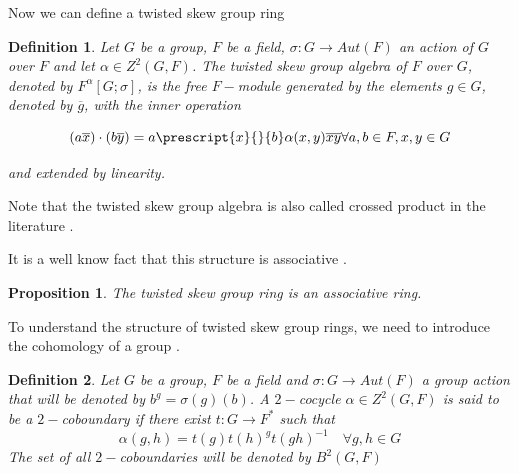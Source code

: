 \documentclass{article}
\newtheorem{proposition}[theorem]{Proposition}
\newtheorem{definition}{Definition}
\begin{document}
Now we can define a twisted skew group ring

\begin{definition}
Let $G$ be a group, $F$ be a field, $\sigma:G \longrightarrow Aut(F)$ an action of $G$ over $F$ and let $\alpha\in Z^2(G,F)$. The twisted skew group algebra of $F$ over $G$, denoted by $F^\alpha [ G; \sigma]$, is the free $F-$module generated by the elements $g\in G$, denoted by $\overline{g}$, with the inner operation

\begin{equation}
(a \overline{x}) \cdot (b \overline{y}) = a \prescript{x}{}{b} \alpha(x,y) \overline{xy} \forall a,b \in F, x,y \in G
\end{equation}

\noindent and extended by linearity.
\end{definition}
Note that the twisted skew group algebra is also called crossed product in the literature \cite{Karpilovsky1989}.

It is a well know fact that this structure is associative \cite{Passman1989}.
\begin{proposition} 
    The twisted skew group ring is an associative ring.
\end{proposition}

To understand the structure of twisted skew group rings, we need to introduce the cohomology of a group \cite{brown1982cohomology}.
\begin{definition}
    Let $G$ be a group, $F$ be a field and $\sigma:G \longrightarrow Aut(F)$ a group action that will be denoted by $b^g = \sigma(g)(b)$. A $2-$cocycle $\alpha\in Z^2(G,F)$ is said to be a $2-$coboundary if there exist $t:G\longrightarrow F^*$ such that
    \begin{equation*}
        \alpha(g,h) = t(g)t(h)^g t(gh)^{-1} \quad \forall g,h\in G
    \end{equation*}
    The set of all $2-$coboundaries will be denoted by $B^2(G,F)$
\end{definition}
\end{document}
